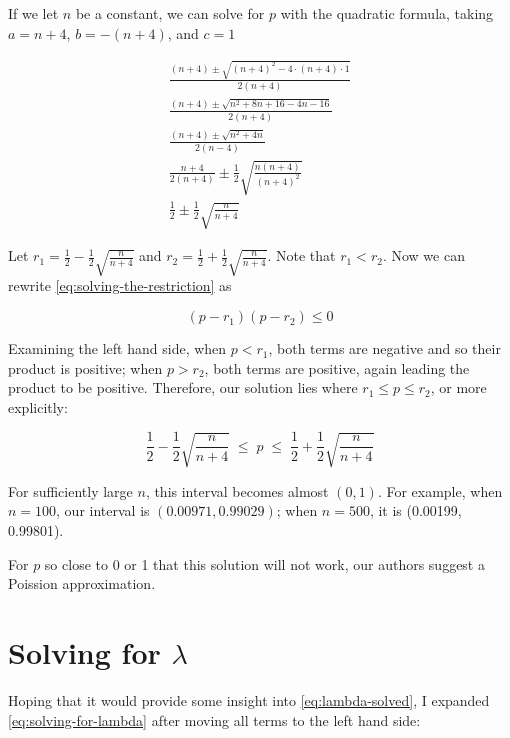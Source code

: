 \documentclass{article}
\begin{document}
If we let $n$ be a constant, we can solve for $p$ with the quadratic formula,
taking $a = n+4$, $b = -(n+4)$, and $c = 1$

\begin{gather*}
  \frac{(n+4) \pm \sqrt{(n+4)^2 - 4 \cdot (n+4) \cdot 1}}{2(n+4)} \\
  \frac{(n+4) \pm \sqrt{n^2 + 8n + 16 - 4n - 16}}{2(n+4)} \\
  \frac{(n+4) \pm \sqrt{n^2 + 4n}}{2(n-4)} \\
  \frac{n+4}{2(n+4)} \pm \frac12 \sqrt{\frac{n(n+4)}{(n+4)^2}} \\
  \frac12 \pm \frac12 \sqrt{\frac{n}{n+4}}
\end{gather*}

Let $r_1 = \frac12 - \frac12 \sqrt{\frac{n}{n+4}}$ and $r_2 = \frac12 + \frac12
\sqrt{\frac{n}{n+4}}$. Note that $r_1 < r_2$. Now we can rewrite
\eqref{eq:solving-the-restriction} as

\begin{equation*}
  (p - r_1)(p - r_2) \leq 0
\end{equation*}

Examining the left hand side, when $p < r_1$, both terms are negative and so
their product is positive; when $p > r_2$, both terms are positive, again
leading the product to be positive. Therefore, our solution lies where $r_1
\leq p \leq r_2$, or more explicitly:

\begin{equation}
 \frac12 - \frac12 \sqrt{\frac{n}{n+4}} \; \leq \; p \; \leq \; \frac12 + \frac12 \sqrt{\frac{n}{n+4}}
\end{equation}

For sufficiently large $n$, this interval becomes almost $(0, 1)$. For example,
when $n=100$, our interval is $(0.00971, 0.99029)$; when $n=500$, it is
(0.00199, 0.99801).

For $p$ so close to 0 or 1 that this solution will not work, our authors
suggest a Poission approximation.

\appendix
\section{Solving for $\lambda$}
\label{sec:solving-for-lambda}

Hoping that it would provide some insight into \eqref{eq:lambda-solved}, I
expanded \eqref{eq:solving-for-lambda} after moving all terms to the left hand
side:
\end{document}
